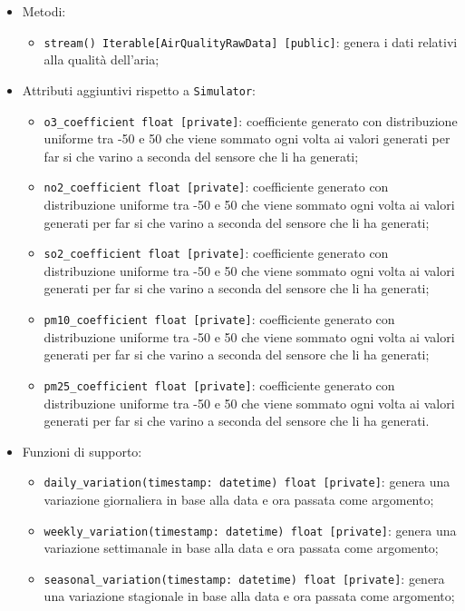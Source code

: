 \begin{itemize}
    \begin{itemize}
        \item Metodi:
        \begin{itemize}
            \item \texttt{stream() Iterable[AirQualityRawData] [public]}: genera i dati relativi alla qualità dell'aria;
        \end{itemize}
        \item Attributi aggiuntivi rispetto a \texttt{Simulator}:
        \begin{itemize}
            \item \texttt{o3\_coefficient float [private]}: coefficiente generato con distribuzione uniforme tra -50 e 50 che viene sommato ogni volta ai valori generati per far si che varino a seconda del sensore che li ha generati;
            \item \texttt{no2\_coefficient float [private]}: coefficiente generato con distribuzione uniforme tra -50 e 50 che viene sommato ogni volta ai valori generati per far si che varino a seconda del sensore che li ha generati;
            \item \texttt{so2\_coefficient float [private]}: coefficiente generato con distribuzione uniforme tra -50 e 50 che viene sommato ogni volta ai valori generati per far si che varino a seconda del sensore che li ha generati;
            \item \texttt{pm10\_coefficient float [private]}: coefficiente generato con distribuzione uniforme tra -50 e 50 che viene sommato ogni volta ai valori generati per far si che varino a seconda del sensore che li ha generati;
            \item \texttt{pm25\_coefficient float [private]}: coefficiente generato con distribuzione uniforme tra -50 e 50 che viene sommato ogni volta ai valori generati per far si che varino a seconda del sensore che li ha generati.
        \end{itemize}
        \item Funzioni di supporto:
        \begin{itemize}
            \item \texttt{daily\_variation(timestamp: datetime) float [private]}: genera una variazione giornaliera in base alla data e ora passata come argomento;
            \item \texttt{weekly\_variation(timestamp: datetime) float [private]}: genera una variazione settimanale in base alla data e ora passata come argomento;
            \item \texttt{seasonal\_variation(timestamp: datetime) float [private]}: genera una variazione stagionale in base alla data e ora passata come argomento;

\end{itemize}
\end{itemize}
\end{itemize}
